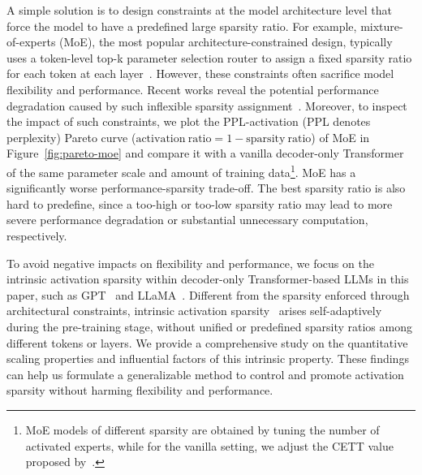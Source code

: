 \documentclass{article} %
\begin{document}
A simple solution is to design constraints at the model architecture level that force the model to have a predefined large sparsity ratio. 
For example, mixture-of-experts (MoE), the most popular architecture-constrained design, typically uses a token-level top-k parameter selection router to assign a fixed sparsity ratio for each token at each layer~\citep{fedus2022switch,zoph2022st}. 
However, these constraints often sacrifice model flexibility and performance.
Recent works reveal the potential performance degradation caused by such inflexible sparsity assignment~\citep{huang2024harder,liu2024gringradientinformedmoe}. Moreover, to inspect the impact of such constraints, we plot the PPL-activation (PPL denotes perplexity) Pareto curve (\underline{$\mathrm{activation\ ratio}=1-\mathrm{sparsity\ ratio}$}) of MoE in Figure~\ref{fig:pareto-moe} and compare it with a vanilla decoder-only Transformer~\citep{touvron2023llama} of the same parameter scale and amount of training data\footnote{MoE models of different sparsity are obtained by tuning the number of activated experts, while for the vanilla setting, we adjust the CETT value proposed by~\citet{zhang2024relu}.}. MoE has a significantly worse performance-sparsity trade-off. The best sparsity ratio is also hard to predefine, since a too-high or too-low sparsity ratio may lead to more severe performance degradation or substantial unnecessary computation, respectively.

To avoid negative impacts on flexibility and performance, we focus on the intrinsic activation sparsity within decoder-only Transformer-based LLMs in this paper, such as GPT~\citep{brown2020language} and LLaMA~\citep{touvron2023llama}.
Different from the sparsity enforced through architectural constraints, intrinsic activation sparsity~\citep{zhang2024relu,song2024prosparse} arises self-adaptively during the pre-training stage, without unified or predefined sparsity ratios among different tokens or layers.
We provide a comprehensive study on the quantitative scaling properties and influential factors of this intrinsic property. These findings can help us formulate a generalizable method to control and promote activation sparsity without harming flexibility and performance.

\end{document}
